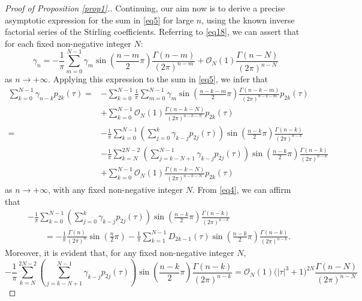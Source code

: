 \documentclass[pdftex]{sigma}
\numberwithin{equation}{section}
\begin{document}
\begin{proof}[Proof of Proposition \ref{prop1}.]
Continuing, our aim now is to derive a precise asymptotic expression for the sum in \eqref{eq5} for large $n$, using the known inverse factorial series of the Stirling coefficients. Referring to \eqref{eq18}, we can assert that for each fixed non-negative integer $N$:
\[
\gamma _n = -\frac{1}{\pi}\sum_{m = 0}^{N- 1} \gamma _m \sin\left( \frac{n - m}{2}\pi \right)\frac{\Gamma (n - m)}{(2\pi )^{n - m}} + \mathcal{O}_N(1) \frac{\Gamma (n - N)}{(2\pi )^{n - N} }
\]
as $n\to+\infty$. Applying this expression to the sum in \eqref{eq5}, we infer that
\begin{align*}
\sum_{k = 0}^{N - 1} \gamma _{n - k} p_{2k} (\tau ) = & -\sum_{k = 0}^{N - 1} \frac{1}{\pi}\sum_{m = 0}^{N - 1} \gamma _m \sin \left( \frac{n - k - m}{2}\pi \right)\frac{\Gamma (n - k - m)}{(2\pi )^{n - k - m} } p_{2k} (\tau ) \\ & + \sum_{k = 0}^{N - 1} \mathcal{O}_N(1) \frac{\Gamma (n - k - N)}{(2\pi )^{n - k - N} }p_{2k} (\tau )
\\ = &-\frac{1}{\pi }\sum_{k = 0}^{N - 1} \left( \sum_{j = 0}^k \gamma _{k - j} p_{2j} (\tau ) \right)\sin \left( \frac{n - k}{2}\pi \right)\frac{\Gamma (n - k)}{(2\pi )^{n - k} } \\ &- \frac{1}{\pi }\sum_{k = N}^{2N- 2} \left( \sum_{j = k - N + 1}^{N-1} \gamma _{k - j} p_{2j} (\tau ) \right)\sin \left( \frac{n - k}{2}\pi\right)\frac{\Gamma (n - k)}{(2\pi )^{n - k}}
\\ & + \sum_{k = 0}^{N - 1} \mathcal{O}_N(1) \frac{\Gamma (n - k - N)}{(2\pi )^{n - k - N} }p_{2k} (\tau )
\end{align*}
as $n\to+\infty$, with any fixed non-negative integer $N$. From \eqref{eq4}, we can affirm that
\begin{align*}
&-\frac{1}{\pi }\sum_{k = 0}^{N - 1} \left( \sum_{j = 0}^k \gamma _{k - j} p_{2j} (\tau ) \right)\sin \left( \frac{n - k}{2}\pi \right)\frac{\Gamma (n - k)}{(2\pi )^{n - k} } \\ &\qquad= -\frac{1}{\pi}\frac{\Gamma (n)}{(2\pi )^n } \sin \left( \frac{n}{2}\pi \right)-\frac{1}{\pi}\sum_{k = 1}^{N - 1} D_{2k - 1} (\tau )\sin \left( \frac{n - k}{2}\pi \right)\frac{\Gamma (n - k)}{(2\pi )^{n - k}}.
\end{align*}
Moreover, it is evident that, for any fixed non-negative integer $N$,
\[
- \frac{1}{\pi }\sum_{k = N}^{2N-2} \left( \sum_{j = k - N + 1}^{N-1} \gamma _{k - j} p_{2j} (\tau ) \right)\sin \left( \frac{n - k}{2}\pi\right)\frac{\Gamma (n - k)}{(2\pi )^{n - k}}= \mathcal{O}_N (1)\bigl(\left| \tau \right|^3 + 1\bigr)^{2N} \frac{\Gamma (n - N)}{(2\pi )^{n - N}}
\]
\end{proof}
\end{document}
